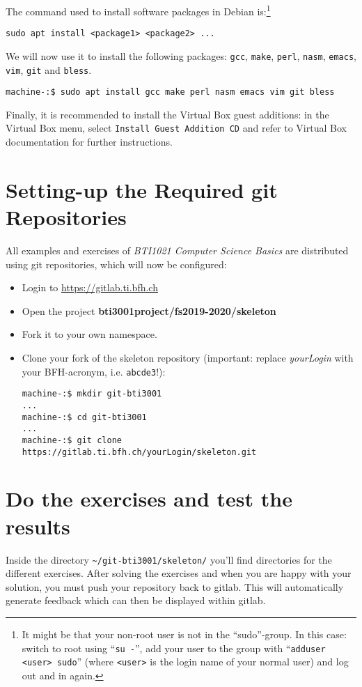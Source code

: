 \documentclass{scrartcl}
\begin{document}
The command used to install software packages in Debian is:\footnote{It might be that your non-root user is not in the \enquote{sudo}-group. In this case: switch to root using \enquote{\texttt{su -}}, add your user to the group with \enquote{\texttt{adduser <user> sudo}} (where \texttt{<user>} is the login name of your normal user) and log out and in again.}

\begin{lstlisting}
sudo apt install <package1> <package2> ...
\end{lstlisting}%

We will now use it to install the following packages: \texttt{gcc}, \texttt{make}, \texttt{perl}, \texttt{nasm}, \texttt{emacs}, \texttt{vim}, \texttt{git} and \texttt{bless}.

\begin{lstlisting}
machine-:$ sudo apt install gcc make perl nasm emacs vim git bless
\end{lstlisting}%

Finally, it is recommended to install the Virtual Box guest additions: in the Virtual Box menu, select \texttt{Install Guest Addition CD} and refer to Virtual Box documentation for further instructions.

\section{Setting-up the Required git Repositories}

All examples and exercises of \emph{BTI1021 Computer Science Basics} are distributed using git repositories, which will now be configured:

\begin{itemize}
\item  Login to \url{https://gitlab.ti.bfh.ch}

\item Open the project \textbf{bti3001project/fs2019-2020/skeleton}

\item Fork it to your own namespace.

\item Clone your fork of the skeleton repository (important: replace \emph{yourLogin} with your BFH-acronym, i.e. \texttt{abcde3}!):

  \begin{lstlisting}
machine-:$ mkdir git-bti3001
...
machine-:$ cd git-bti3001
...
machine-:$ git clone https://gitlab.ti.bfh.ch/yourLogin/skeleton.git
    \end{lstlisting}%

\end{itemize}

\section{Do the exercises and test the results}

Inside the directory \texttt{\textasciitilde{}/git-bti3001/skeleton/} you'll find directories for the different exercises. After solving the exercises and when you are happy with your solution, you must push your repository back to gitlab. This will automatically generate feedback which can then be displayed within gitlab.
\end{document}

